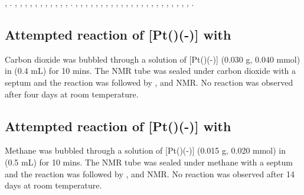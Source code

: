 ,
.
,
,
,
,
,
,
,
,
,
,
,
.
,
,
,
,
,
,
,
,
,
,
,
,
,
,
,
,
,
,
,
,
,
,
,
.


\subsection*{Attempted reaction of \texorpdfstring{[Pt(\tButhixantphos)(-)]} P with \texorpdfstring{} C}

Carbon dioxide was bubbled through a solution of [Pt(\tButhixantphos)(-)] (0.030 g, 0.040 mmol) in  (0.4 mL) for 10 mins.  The NMR tube was sealed under carbon dioxide with a septum and the reaction was followed by \proton{}, \carbon{} and \phosphorus{} NMR.  No reaction was observed after four days at room temperature.  

\subsection*{Attempted reaction of \texorpdfstring{[Pt(\tButhixantphos)(-)]} P with \texorpdfstring{} C}

Methane was bubbled through a solution of [Pt(\tButhixantphos)(-)] (0.015 g, 0.020 mmol)  in  (0.5 mL) for 10 mins.  The NMR tube was sealed under methane with a septum and the reaction was followed by \proton{}, \carbon{} and \phosphorus{} NMR.  No reaction was observed after 14 days at room temperature.

